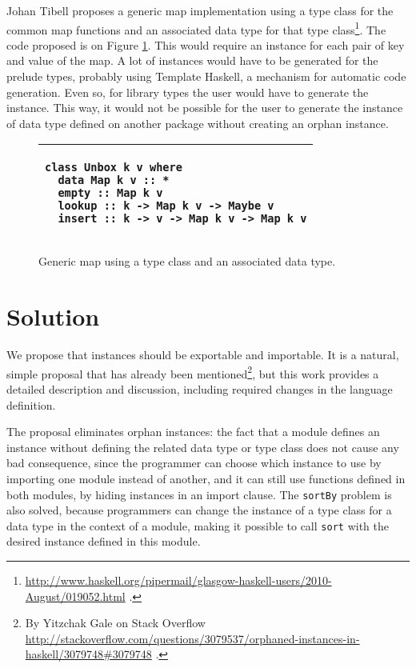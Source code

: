 \documentclass[msc]{ppgccufmg}
\begin{document}
Johan Tibell proposes a generic map implementation using a type class for the common map functions and an associated data type for that type class\footnote{\url{http://www.haskell.org/pipermail/glasgow-haskell-users/2010-August/019052.html} .}.
The code proposed is on Figure \ref{johan}.
This would require an instance for each pair of key and value of the map.
A lot of instances would have to be generated for the prelude types, probably using Template Haskell, a mechanism for automatic code generation.
Even so, for library types the user would have to generate the instance.
This way, it would not be possible for the user to generate the instance of data type defined on another package without creating an orphan instance.

\begin{figure}
\caption{Generic map using a type class and an associated data type.\label{johan}}
\begin{tabular}{|p{\textwidth}|}
\hline
\begin{verbatim}
class Unbox k v where
  data Map k v :: *
  empty :: Map k v
  lookup :: k -> Map k v -> Maybe v
  insert :: k -> v -> Map k v -> Map k v
\end{verbatim}
\\
\hline
\end{tabular}
\end{figure}

\chapter{Solution}
\label{solution}

We propose that instances should be exportable and importable.  It is a natural, simple proposal that has already
been mentioned\footnote{By Yitzchak Gale on Stack Overflow
  \url{http://stackoverflow.com/questions/3079537/orphaned-instances-in-haskell/3079748\#3079748}
  .}, but this work provides a detailed description and discussion,
including required changes in the language definition.

The proposal eliminates orphan
instances: the fact that a module defines an instance without
defining the related data type or type class does not cause any bad
consequence, since the programmer can choose which instance to use
by importing one module instead of another, and it can still use
functions defined in both modules, by hiding instances in an import
clause.  The \texttt{sortBy} problem is also solved, because
programmers can change the instance of a type class for a data type in
the context of a module, making it possible to call \texttt{sort} with
the desired instance defined in this module.
\end{document}
